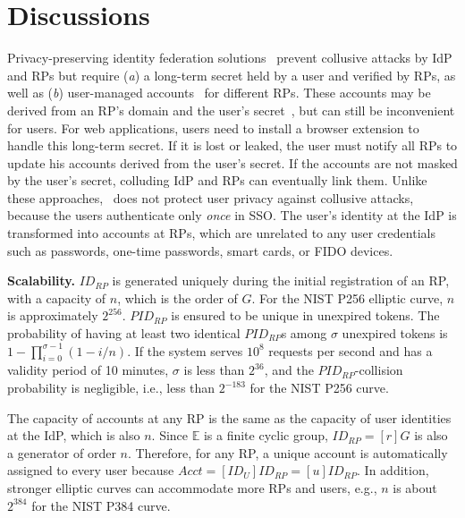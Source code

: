 \section{Discussions}
\label{sec:discussion}

Privacy-preserving identity federation solutions~\cite{ELPASSO, UnlimitID, idemix, PseudoID, Opaak, uprov} prevent collusive attacks by IdP and RPs but require (\emph{a}) a long-term secret held by a user and verified by RPs, as well as (\emph{b}) user-managed accounts~\cite{PseudoID} for different RPs. These accounts may be derived from an RP's domain and the user's secret~\cite{ELPASSO, UnlimitID, Opaak, uprov,idemix}, but can still be inconvenient for users. For web applications, users need to install a browser extension to handle this long-term secret. If it is lost or leaked, the user must notify all RPs to update his accounts derived from the user's secret. If the accounts are not masked by the user's secret, colluding IdP and RPs can eventually link them. 
Unlike these approaches, \usso~does not protect user privacy against collusive attacks, because the users authenticate only \emph{once} in SSO. The user's identity at the IdP is transformed into accounts at RPs, which are unrelated to any user credentials such as passwords, one-time passwords, smart cards, or FIDO devices.

\noindent \textbf{Scalability.} $ID_{RP}$ is generated uniquely during the initial registration of an RP, with a capacity of $n$, which is the order of $G$. For the NIST P256 elliptic curve, $n$ is approximately $2^{256}$. 
$PID_{RP}$ is ensured to be unique in unexpired tokens. The probability of having at least two identical $PID_{RP}$s among $\sigma$ unexpired tokens is $1-\prod_{i=0}^{\sigma-1}(1-i/n)$. If the system serves $10^{8}$ requests per second and has a validity period of 10 minutes, $\sigma$ is less than $2^{36}$, and the $PID_{RP}$-collision probability is negligible, i.e., less than $2^{-183}$ for the NIST P256 curve.

The capacity of accounts at any RP is the same as the capacity of user identities at the IdP, which is also $n$. Since $\mathbb{E}$ is a finite cyclic group, $ID_{RP} = [r]G$ is also a generator of order $n$. Therefore, for any RP, a unique account is automatically assigned to every user because $Acct =  [ID_U]ID_{RP} = [u]ID_{RP}$. 
In addition, stronger elliptic curves can accommodate more RPs and users, e.g., $n$ is about $2^{384}$ for the NIST P384 curve.


